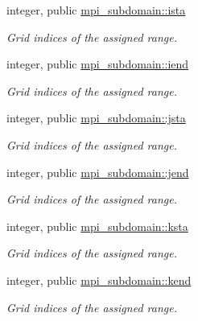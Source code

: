 \textbf{ }\par
\begin{DoxyCompactItemize}
\item 
integer, public \mbox{\hyperlink{namespacempi__subdomain_ab8925faaa6f45326c1d11efa37e03566}{mpi\+\_\+subdomain\+::ista}}
\begin{DoxyCompactList}\small\item\em Grid indices of the assigned range. \end{DoxyCompactList}\item 
integer, public \mbox{\hyperlink{namespacempi__subdomain_abbd7d35107c53bcfd2b2b52771f4aa67}{mpi\+\_\+subdomain\+::iend}}
\begin{DoxyCompactList}\small\item\em Grid indices of the assigned range. \end{DoxyCompactList}\item 
integer, public \mbox{\hyperlink{namespacempi__subdomain_ac85bfba1caf77f9c3c0047fe9450fee6}{mpi\+\_\+subdomain\+::jsta}}
\begin{DoxyCompactList}\small\item\em Grid indices of the assigned range. \end{DoxyCompactList}\item 
integer, public \mbox{\hyperlink{namespacempi__subdomain_a06433a0d1a081c51202a0010c21c9d36}{mpi\+\_\+subdomain\+::jend}}
\begin{DoxyCompactList}\small\item\em Grid indices of the assigned range. \end{DoxyCompactList}\item 
integer, public \mbox{\hyperlink{namespacempi__subdomain_acd499eb1d07159aa9f5c878f9519b00f}{mpi\+\_\+subdomain\+::ksta}}
\begin{DoxyCompactList}\small\item\em Grid indices of the assigned range. \end{DoxyCompactList}\item 
integer, public \mbox{\hyperlink{namespacempi__subdomain_af9934313b1ccbcb09f30916df3326076}{mpi\+\_\+subdomain\+::kend}}
\begin{DoxyCompactList}\small\item\em Grid indices of the assigned range. \end{DoxyCompactList}\end{DoxyCompactItemize}

